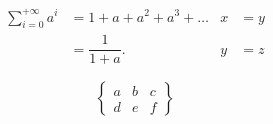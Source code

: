 \documentclass[a5paper, 12pt]{article}
\begin{document}

\begin{align}
\sum_{i=0}^{+ \infty} a^i & = 1 + a + a^2 + a^3 + \ldots & x & =y \nonumber
\\
	& = \dfrac{1}{1+a}.							 & y & =z \nonumber
\end{align}

\huge \Yinyang
	
	\[
	\begin{Bmatrix}
	a & b & c \\
	d & e & f
	\end{Bmatrix}
\]	

















	
	
\end{document}
